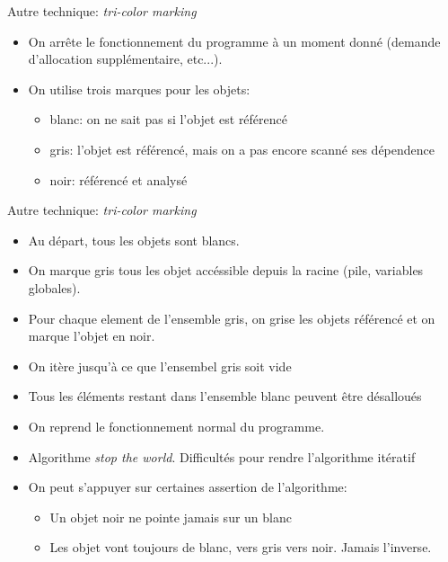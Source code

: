 \begin{frame}[fragile=singleslide]{Autre technique: \emph{tri-color marking}}
  \begin{itemize}
  \item On  arrête le  fonctionnement du programme  à un  moment donné
    (demande d'allocation supplémentaire, etc...).
  \item On utilise trois marques pour les objets:
    \begin{itemize}
    \item blanc: on ne sait pas si l'objet est référencé
    \item gris: l'objet est référencé, mais on a pas encore scanné ses
      dépendence
    \item noir: référencé et analysé
    \end{itemize}
  \end{itemize}
\end{frame}  

\begin{frame}[fragile=singleslide]{Autre   technique:  \emph{tri-color
      marking}}
  \begin{itemize}
  \item Au départ, tous les objets sont blancs.
  \item  On marque  gris tous  les objet  accéssible depuis  la racine
    (pile, variables globales).
  \item Pour  chaque element de  l'ensemble gris, on grise  les objets
    référencé et on marque l'objet en noir.
  \item On itère jusqu'à ce que l'ensembel gris soit vide
  \item Tous  les éléments restant dans l'ensemble  blanc peuvent être
    désalloués
  \item On reprend le fonctionnement normal du programme.
  \item  Algorithme \emph{stop  the world}.   Difficultés  pour rendre
    l'algorithme itératif
  \item On peut s'appuyer sur certaines assertion de l'algorithme:
    \begin{itemize}
    \item Un objet noir ne pointe jamais sur un blanc
    \item  Les   objet  vont  toujours   de  blanc,  vers   gris  vers
      noir. Jamais l'inverse.
    \end{itemize}
  \end{itemize}
\end{frame}

